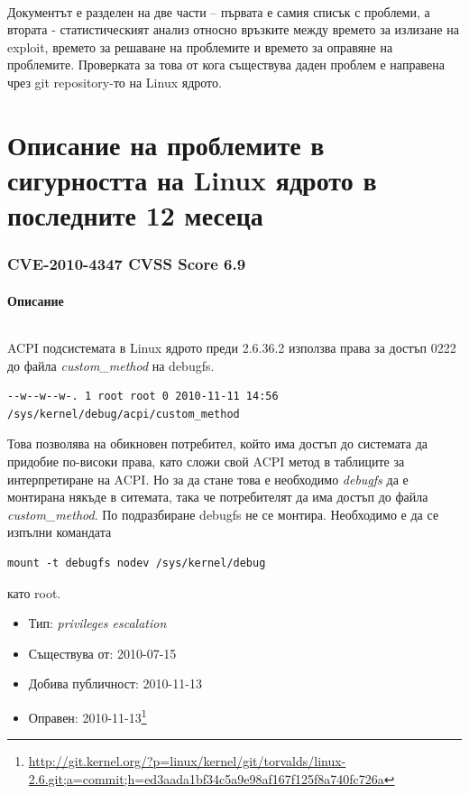 \documentclass[a4paper,12pt,leqno]{article}
\begin{document}
\paragraph{}
Документът е разделен на две части – първата е самия списък с проблеми, а втората - статистическият анализ относно връзките между времето за излизане на exploit, времето за 
решаване на проблемите и времето за оправяне на проблемите.
Проверката за това от кога съществува даден проблем е направена чрез git repository-то на Linux ядрото.

\newpage
\part{Описание на проблемите в сигурността на Linux ядрото в последните 12 месеца}
\section{CVE-2010-4347 CVSS Score 6.9}
\subsection{Описание}
\paragraph{}
ACPI подсистемата в Linux ядрото преди 2.6.36.2 използва права за достъп 0222 до файла \textit{custom\_method} на debugfs.
\begin{verbatim}
--w--w--w-. 1 root root 0 2010-11-11 14:56 /sys/kernel/debug/acpi/custom_method
\end{verbatim}
Това позволява на обикновен потребител, който има достъп до системата да придобие по-високи права, като сложи свой ACPI метод в таблиците за интерпретиране на ACPI. Но за да стане това е необходимо \textit{debugfs} да е монтирана някъде в ситемата, така че потребителят да има достъп до файла \textit{custom\_method}. По подразбиране debugfs не се монтира. Необходимо е да се изпълни командата
\begin{verbatim}
mount -t debugfs nodev /sys/kernel/debug
\end{verbatim}
като root.

\begin{itemize}
    \item Тип: \textit{privileges escalation}
    \item Съществува от: 2010-07-15
  	\item Добива публичност: 2010-11-13
    \item Оправен: 2010-11-13\footnote{\url{http://git.kernel.org/?p=linux/kernel/git/torvalds/linux-2.6.git;a=commit;h=ed3aada1bf34c5a9e98af167f125f8a740fc726a}}
\end{itemize}
\end{document}
